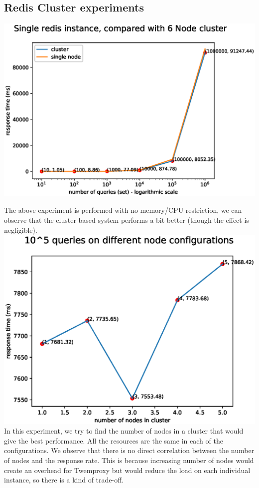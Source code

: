 \documentclass[11pt]{article}
\begin{document}
\pagebreak
\subsection*{Redis Cluster experiments}
\includegraphics[width=\textwidth]{fig5.eps}

The above experiment is performed with no memory/CPU restriction, we can observe that the
cluster based system performs a bit better (though the effect is negligible).\\
\includegraphics[width=\textwidth]{fig6.eps}
In this experiment, we try to find the number of nodes in a cluster that would
give the best performance. All the resources are the same in each of the configurations.
We observe that there is no direct correlation between the number of nodes and the response rate.
This is because increasing number of nodes would create an overhead for Twemproxy but would
reduce the load on each individual instance, so there is a kind of trade-off.\\
\end{document}
